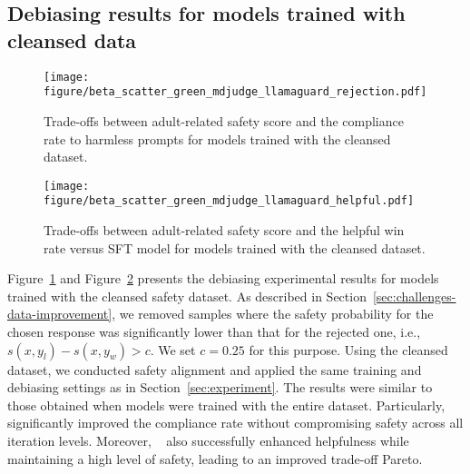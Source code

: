 \subsection{Debiasing results for models trained with cleansed data}
\label{appendix:experiment-cleansed-data}
\begin{figure}[h]
    \centering
    \texttt{[image: figure/beta\_scatter\_green\_mdjudge\_llamaguard\_rejection.pdf]}
    \caption{Trade-offs between adult-related safety score and the compliance rate to harmless prompts for models trained with the cleansed dataset.}
    \label{fig:trade-offs-compliance-cleansed}
\end{figure}

\begin{figure}[h]
    \centering
    \texttt{[image: figure/beta\_scatter\_green\_mdjudge\_llamaguard\_helpful.pdf]}
    \caption{Trade-offs between adult-related safety score and the helpful win rate versus SFT model for models trained with the cleansed dataset.}
    \label{fig:trade-offs-helpfulness-cleansed}
\end{figure}

Figure~\ref{fig:trade-offs-compliance-cleansed} and Figure~\ref{fig:trade-offs-helpfulness-cleansed} presents the debiasing experimental results for models trained with the cleansed safety dataset. As described in Section~\ref{sec:challenges-data-improvement}, we removed samples where the safety probability for the chosen response was significantly lower than that for the rejected one, i.e., \( s(x, y_l) - s(x, y_w) > c \). We set \( c = 0.25 \) for this purpose. Using the cleansed dataset, we conducted safety alignment and applied the same training and debiasing settings as in Section~\ref{sec:experiment}. The results were similar to those obtained when models were trained with the entire dataset. Particularly, \algoshort~ significantly improved the compliance rate without compromising safety across all iteration levels. Moreover, \algoshort~ also successfully enhanced helpfulness while maintaining a high level of safety, leading to an improved trade-off Pareto.

\clearpage